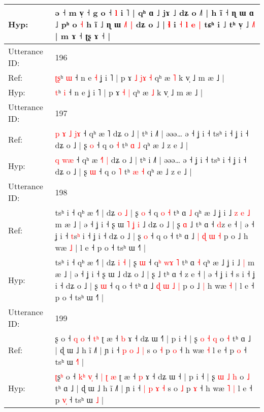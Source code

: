 \documentclass[10pt]{article}
\DeclareRobustCommand{\hl}[1]{{\textcolor{red}{#1}}}
\begin{document}
\begin{longtable}{ll}
Hyp: & ə ˧ m v̩ ˧ g o ˧ \hl{l} i ˥ | qʰ ɑ ˩ jɤ ˩ dʑ o ˩˥ | h ĩ ˧ ɳ ɯ\hl{}\hl{}\hl{}\hl{} ɑ ˩ pʰ o \hl{˧} h ĩ ˩ ɳ ɯ \hl{˩}˥\hl{ }\hl{|} dʑ o ˩ | \hl{}\hl{}\hl{ɬ} i \hl{}\hl{˧} \hl{l} \hl{e} \hl{|} tɕʰ i ˩ tʰ v̩ ˩\hl{}\hl{} \hl{}\hl{}\hl{˩}˥ | m ɤ ˧ ʈʂ ɤ ˧ |
 \\
\midrule
Utterance ID: & 196 \\
Ref: & \hl{ʈ}\hl{ʂ}ʰ \hl{ɯ} ˧ n e\hl{ }\hl{˧} ʝ i ˥ | p ɤ\hl{ }\hl{˩} \hl{j}\hl{ɤ} \hl{˧} qʰ æ \hl{˥} k v̩ ˩ m æ ˩ |
 \\
Hyp: & \hl{}\hl{t}ʰ \hl{i} ˧ n e\hl{}\hl{} ʝ i ˥ | p ɤ\hl{}\hl{} \hl{}\hl{˧} \hl{|} qʰ æ \hl{˩} k v̩ ˩ m æ ˩ |
 \\
\midrule
Utterance ID: & 197 \\
Ref: & \hl{p}\hl{ }\hl{ɤ}\hl{ }\hl{˩} \hl{j}\hl{ɤ} ˧ qʰ æ \hl{}˥\hl{}\hl{} dʑ o ˩ | tʰ i ˩˥ | əəə… ə ˧ ʝ i ˧ tsʰ i ˧ ʝ i ˧ dʑ o ˩ | ʂ \hl{o} ˧ q o \hl{˧} tʰ \hl{ɑ} \hl{˩} qʰ æ ˩ z e ˩ |
 \\
Hyp: & \hl{}\hl{}\hl{}\hl{}\hl{q} \hl{w}\hl{æ} ˧ qʰ æ \hl{˧}˥\hl{ }\hl{|} dʑ o ˩ | tʰ i ˩˥ | əəə… ə ˧ ʝ i ˧ tsʰ i ˧ ʝ i ˧ dʑ o ˩ | ʂ \hl{ɯ} ˧ q o \hl{˥} tʰ \hl{æ} \hl{˧} qʰ æ ˩ z e ˩ |
 \\
\midrule
Utterance ID: & 198 \\
Ref: & tsʰ i ˧ qʰ æ ˧˥ | dʑ \hl{o} \hl{˩} | ʂ \hl{o} ˧ q\hl{} \hl{}\hl{o} \hl{˧} tʰ ɑ \hl{˩} qʰ æ ˩ ʝ i ˩\hl{ }\hl{z}\hl{ }\hl{e} \hl{˩} m æ ˩ | ə ˧ ʝ i ˧ ʂ ɯ\hl{ }\hl{˥}\hl{ }\hl{ʝ}\hl{ }\hl{i} ˩ dʑ o ˩ | ʂ\hl{ }\hl{ɑ} ˩ tʰ ɑ ˧ \hl{d}z e ˧ | ə ˧ ʝ i ˧ \hl{t}s\hl{ʰ} i ˧ ʝ i ˧ dʑ o ˩ | ʂ \hl{o} ˧ q o ˧ tʰ ɑ ˩ \hl{|} \hl{ɖ} \hl{ɯ} \hl{˧} p o ˩\hl{}\hl{} h wæ \hl{˩} | l e ˧ p o ˧ tsʰ ɯ ˧˥ |
 \\
Hyp: & tsʰ i ˧ qʰ æ ˧˥ | dʑ \hl{i} \hl{˧} | ʂ \hl{ɯ} ˧ q\hl{ʰ} \hl{w}\hl{ɤ} \hl{˥} tʰ ɑ \hl{˧} qʰ æ ˩ ʝ i ˩\hl{}\hl{}\hl{}\hl{} \hl{|} m æ ˩ | ə ˧ ʝ i ˧ ʂ ɯ\hl{}\hl{}\hl{}\hl{}\hl{}\hl{} ˩ dʑ o ˩ | ʂ\hl{}\hl{} ˩ tʰ ɑ ˧ \hl{}z e ˧ | ə ˧ ʝ i ˧ \hl{}s\hl{} i ˧ ʝ i ˧ dʑ o ˩ | ʂ \hl{ɯ} ˧ q o ˧ tʰ ɑ ˩ \hl{ɖ} \hl{ɯ} \hl{˩} \hl{|} p o ˩\hl{ }\hl{|} h wæ \hl{˧} | l e ˧ p o ˧ tsʰ ɯ ˧˥ |
 \\
\midrule
Utterance ID: & 199 \\
Ref: & \hl{}ʂ\hl{} o ˧ \hl{}\hl{q} \hl{}\hl{o} ˧\hl{}\hl{} \hl{}\hl{t}\hl{ʰ} ʈ æ ˧ \hl{b} ɤ ˧ dʑ ɯ ˧\hl{˥} | p i ˧ | ʂ \hl{o} \hl{˧} \hl{q} o \hl{˧} tʰ ɑ ˩ | ɖ ɯ ˩ h ĩ ˩˥ | ɲ i ˧ \hl{p} \hl{o} \hl{˩} \hl{|} s o \hl{˧} p \hl{o} ˧ h wæ\hl{}\hl{} \hl{˧} l e ˧ p \hl{}\hl{o} ˧ tsʰ ɯ \hl{˧}\hl{˥} |
 \\
Hyp: & \hl{ʈ}ʂ\hl{ʰ} o ˧ \hl{k}\hl{ʰ} \hl{v}\hl{̩} ˧\hl{ }\hl{|} \hl{ʈ}\hl{ }\hl{æ} ʈ æ ˧ \hl{p} ɤ ˧ dʑ ɯ ˧\hl{} | p i ˧ | ʂ \hl{ɯ} \hl{˩} \hl{h} o \hl{˩} tʰ ɑ ˩ | ɖ ɯ ˩ h ĩ ˩˥ | ɲ i ˧ \hl{|} \hl{p} \hl{ɤ} \hl{˧} s o \hl{˩} p \hl{ɤ} ˧ h wæ\hl{ }\hl{˥} \hl{|} l e ˧ p \hl{v}\hl{̩} ˧ tsʰ ɯ \hl{}\hl{˩} |

\end{longtable}
\end{document}
